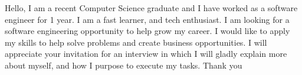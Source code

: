 Hello, I am a recent Computer Science graduate and I have worked as a software engineer for 1 year. I am a fast learner, and tech enthusiast. I am looking for a software engineering opportunity to help grow my career. I would like to apply my skills to help solve problems and create business opportunities. I will appreciate your invitation for an interview in which I will gladly explain more about myself, and how I purpose to execute my tasks. Thank you
